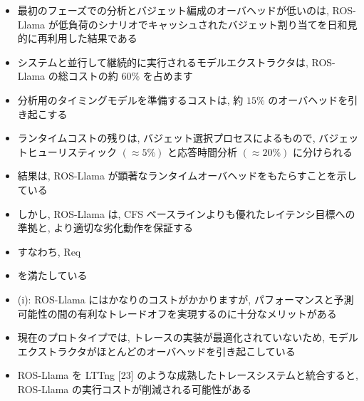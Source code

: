 \begin{frame}{}
    \begin{itemize}
        \item 最初のフェーズでの分析とバジェット編成のオーバヘッドが低いのは, ROS-Llama が低負荷のシナリオでキャッシュされたバジェット割り当てを日和見的に再利用した結果である
\item システムと並行して継続的に実行されるモデルエクストラクタは, ROS-Llama の総コストの約 $60 \%$ を占めます
\item 分析用のタイミングモデルを準備するコストは, 約 $15 \%$ のオーバヘッドを引き起こする
\item ランタイムコストの残りは, バジェット選択プロセスによるもので, バジェットヒューリスティック $(\approx 5 \%)$ と応答時間分析 $(\approx 20 \%)$ に分けられる
    \end{itemize}
\end{frame}

\begin{frame}{}
    \begin{itemize}
        \item 結果は, ROS-Llama が顕著なランタイムオーバヘッドをもたらすことを示している
\item しかし, ROS-Llama は, CFS ベースラインよりも優れたレイテンシ目標への準拠と, より適切な劣化動作を保証する
\item すなわち, Req
\item を満たしている
\item (i): ROS-Llama にはかなりのコストがかかりますが, パフォーマンスと予測可能性の間の有利なトレードオフを実現するのに十分なメリットがある
    \end{itemize}
\end{frame}

\begin{frame}{}
    \begin{itemize}
        \item 現在のプロトタイプでは, トレースの実装が最適化されていないため, モデルエクストラクタがほとんどのオーバヘッドを引き起こしている
\item ROS-Llama を LTTng [23] のような成熟したトレースシステムと統合すると, ROS-Llama の実行コストが削減される可能性がある
    \end{itemize}
\end{frame}
